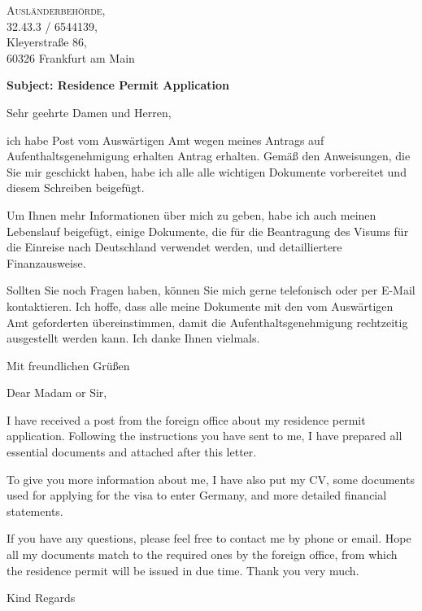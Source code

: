 \documentclass[a4paper, 11pt]{letter}
\date{Frankfurt, 09 September 2021}  %
\begin{document}
\begin{letter}
{
    {\scshape  Ausländerbehörde},\\
    \small 32.43.3 / 6544139,\\
    \small Kleyerstraße 86, \\
    \small 60326 Frankfurt am Main 
    
}


\opening{\normalfont \textbf{Subject: Residence Permit Application}}
\thispagestyle{fancy}


Sehr geehrte Damen und Herren, 

ich habe Post vom Auswärtigen Amt wegen meines Antrags auf Aufenthaltsgenehmigung erhalten 
Antrag erhalten. Gemäß den Anweisungen, die Sie mir geschickt haben, habe ich alle 
alle wichtigen Dokumente vorbereitet und diesem Schreiben beigefügt. 

Um Ihnen mehr Informationen über mich zu geben, habe ich auch meinen Lebenslauf beigefügt, 
einige Dokumente, die für die Beantragung des Visums für die Einreise nach Deutschland verwendet werden, 
und detailliertere Finanzausweise. 

Sollten Sie noch Fragen haben, können Sie mich gerne telefonisch oder per E-Mail kontaktieren. 
Ich hoffe, dass alle meine Dokumente mit den vom Auswärtigen Amt geforderten übereinstimmen, 
damit die Aufenthaltsgenehmigung rechtzeitig ausgestellt werden kann. 
Ich danke Ihnen vielmals.

Mit freundlichen Grüßen

\dashuline{ $ \ \ \ \  \ \ \ \  \ \ \ \  \ \ \ \  \ \ \ \  \ \ \ \  \ \ \ \  \ \ \ \  \ \ \ \  \ \ \ \  \ \ \ \  \ \ \ \  \ \ \ \  \ \ \ \  \ \ \ \  \ \ \ \ \ \ \ \  \ \ \ \  \ \ \ \  \ \ \ \  \ \ \ \  \ \ \ \  \ \ \ \  \ \ \ \  \ \ \ \  \ \ \ \  \ \ \ \  \ \ \ \  \ \ \ \  \ \ \ \  \ \ \ \  \ \ \ \ \ \ \ \  \ \ \ \  \ \ \ \  \ \ \ \  \ \ \ \ \ \ \ \ \ \ \  \ \ \ \  \ \ \ \ $               }
\vspace{0.2cm}

Dear Madam or Sir,

I have received a post from the foreign office about my residence permit 
application. Following the instructions you have sent to me, I have prepared 
all essential documents and attached after this letter. 

To give you more information about me, I have also put my CV, 
some documents used for applying for the visa to enter Germany, 
and more detailed financial statements. 

If you have any questions, please feel free to contact me by phone or email. 
Hope all my documents match to the required ones by the foreign office, 
from which the residence permit will be issued in due time. 
Thank you very much.


\closing{Kind Regards}

\end{letter}
\end{document}
